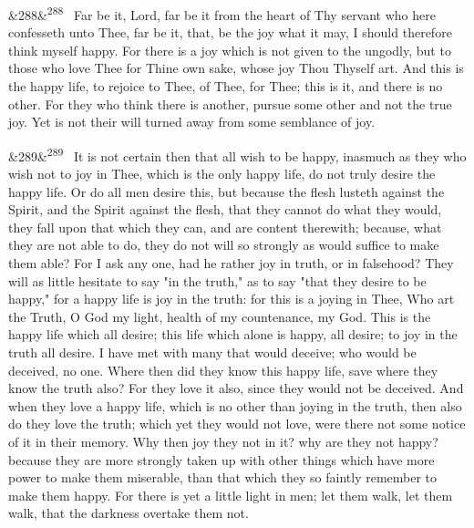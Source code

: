 \documentclass[12pt]{article}
\newcommand{\para}[1][]{\par\noindent\ifx&#1&\else\textsuperscript{\footnotesize #1}~\fi}
\begin{document}
\para[288] Far be it, Lord, far be it from the heart of Thy servant who here confesseth unto Thee, far be it, that, be the joy what it may, I should therefore think myself happy. For there is a joy which is not given to the ungodly, but to those who love Thee for Thine own sake, whose joy Thou Thyself art. And this is the happy life, to rejoice to Thee, of Thee, for Thee; this is it, and there is no other. For they who think there is another, pursue some other and not the true joy. Yet is not their will turned away from some semblance of joy.

\para[289] It is not certain then that all wish to be happy, inasmuch as they who wish not to joy in Thee, which is the only happy life, do not truly desire the happy life. Or do all men desire this, but because the flesh lusteth against the Spirit, and the Spirit against the flesh, that they cannot do what they would, they fall upon that which they can, and are content therewith; because, what they are not able to do, they do not will so strongly as would suffice to make them able? For I ask any one, had he rather joy in truth, or in falsehood? They will as little hesitate to say "in the truth," as to say "that they desire to be happy," for a happy life is joy in the truth: for this is a joying in Thee, Who art the Truth, O God my light, health of my countenance, my God. This is the happy life which all desire; this life which alone is happy, all desire; to joy in the truth all desire. I have met with many that would deceive; who would be deceived, no one. Where then did they know this happy life, save where they know the truth also? For they love it also, since they would not be deceived. And when they love a happy life, which is no other than joying in the truth, then also do they love the truth; which yet they would not love, were there not some notice of it in their memory. Why then joy they not in it? why are they not happy? because they are more strongly taken up with other things which have more power to make them miserable, than that which they so faintly remember to make them happy. For there is yet a little light in men; let them walk, let them walk, that the darkness overtake them not.
\end{document}
